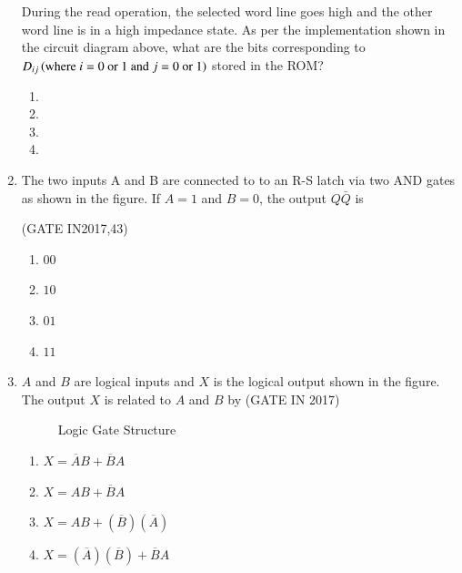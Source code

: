 \begin{enumerate}
		During the read operation, the selected word line goes high and the other word line is in a high impedance state. As per the implementation shown in the circuit diagram above, what are the bits corresponding to $D_{ij}\left(\text{where $i=0$ or $1$ and $j=0$ or $1$}\right)$ stored in the ROM?
\begin{enumerate}
    \item {}
    \item {}
    \item {}    
    \item {}
\end{enumerate}

\item The two inputs A and B are connected to to an R-S latch via two AND gates as shown in the figure. If $A=1$ and $B=0$, the output $Q\bar{Q}$ is
    \begin{figure}[H]
        \centering
        
       \end{figure}
       \hfill(GATE IN2017,43)
    \begin{enumerate}
   		\item $00$ 
   		\item $10$ 
   		\item $01$ 
   		\item $11$ 
   
   \end{enumerate}
\item $A$ and $B$ are logical inputs and $X$ is the logical output shown in the figure. The output $X$ is related to $A$ and $B$ by \hfill{(GATE IN 2017)}
\begin{figure}[!ht]
\centering

\label{fig:gate_in_2017_30}
\caption{Logic Gate Structure}
\end{figure}
\begin{enumerate}[label=\Alph*.]
\item $X = \overline{A}B + \overline{B}A$
\item $X = AB + \overline{B}A$
\item $X = AB + (\overline{B})(\overline{A})$
\item $X = (\overline{A})(\overline{B}) + \overline{B}A$
\end{enumerate}



\end{enumerate}
